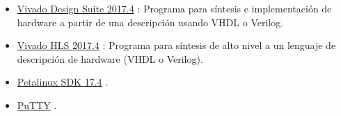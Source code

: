 \begin{itemize}
\item \href{http://www.xilinx.com/products/design-tools/vivado.html}{Vivado Design Suite 2017.4} \citep{Vivad98}: Programa para síntesis e implementación de hardware a partir de una descripción usando VHDL o Verilog.
\item \href{http://www.xilinx.com/products/design-tools/vivado/integration/esl-design.html}{Vivado HLS 2017.4} \citep{Vivad77}: Programa para síntesis de alto nivel a un lenguaje de descripción de hardware (VHDL o Verilog).
\item \href{http://www.xilinx.com/products/design-tools/embedded-software/petalinux-sdk.html}{Petalinux SDK 17.4} \citep{PetaL29}.
\item \href{http://www.putty.org}{PuTTY} \citep{Put}.
\end{itemize}

